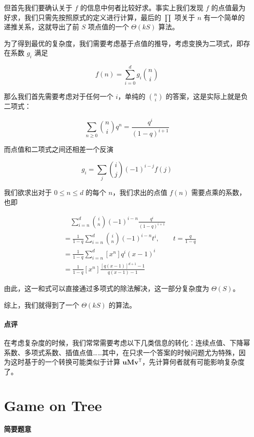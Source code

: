 \documentclass[12pt]{ctexart}
\theoremstyle{theorem}
\theoremstyle{theorem}
\begin{document}
但首先我们要确认关于 $f$ 的信息中何者比较好求。事实上我们发现 $f$ 的点值最为好求，我们只需先按照原式的定义进行计算，最后的 $\prod$ 项关于 $n$ 有一个简单的递推关系，这就导出了前 $S$ 项点值的一个 $\Theta(kS)$ 算法。

为了得到最优的复杂度，我们需要考虑基于点值的推导，考虑变换为二项式，即存在系数 $g_i$ 满足

$$
f(n) = \sum_{i=0}^{d} g_i \binom n i
$$

那么我们首先需要考虑对于任何一个 $i$，单纯的 $\binom n i$ 的答案，这是实际上就是负二项式：

$$
\sum_{n\ge 0} \binom n i q^n = \frac{q^i}{(1-q)^{i+1}}
$$

而点值和二项式之间还相差一个反演

$$
g_i = \sum_j \binom i j (-1)^{i-j} f(j)
$$

我们欲求出对于 $0\le n\le d$ 的每个 $n$，我们求出的点值 $f(n)$ 需要点乘的系数，也即

\begin{align*}
&\quad \sum_{i=n}^{d}\binom i n (-1)^{i-n} \frac{q^i}{(1-q)^{i+1}}\\
&= \frac 1{1-q}\sum_{i=n}^{d}\binom i n (-1)^{i-n} t^i, \qquad t=\frac q{1-q}\\
&= \frac 1{1-q}\sum_{i=n}^{d} [x^n] q^i(x-1)^i\\
&= \frac 1{1-q}[x^n] \frac{[q(x-1)]^{d+1}-1}{q(x-1)-1}
\end{align*}

由此，这一和式可以直接通过多项式的除法解决，这一部分复杂度为 $\Theta(S)$。

综上，我们就得到了一个 $\Theta(kS)$ 的算法。

\paragraph{点评} 在考虑复杂度的时候，我们常常需要考虑以下几类信息的转化：连续点值、下降幂系数、多项式系数、插值点值……其中，在只求一个答案的时候问题尤为特殊，因为这时基于的一个转换可能类似于计算 $\mathbf {uM}\mathbf v^{\mathsf T}$，先计算何者就有可能影响复杂度了。

\newpage

\section{Game on Tree}

\paragraph{简要题意}
\end{document}
